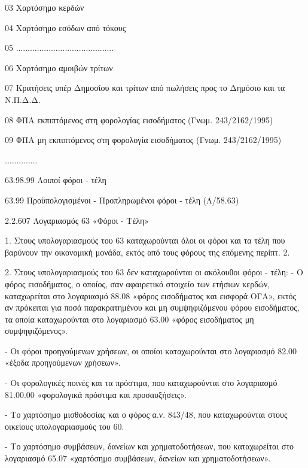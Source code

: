 \documentclass[A4,10pt,greek]{book}
\begin{document}
                              03   Χαρτόσημο κερδών

                              04   Χαρτόσημο εσόδων από τόκους

                              05   ..........................................

                              06   Χαρτόσημο αμοιβών τρίτων

                              07   Κρατήσεις υπέρ Δημοσίου και τρίτων από πωλήσεις προς το
                                      Δημόσιο και τα Ν.Π.Δ.Δ.

                              08   ΦΠΑ εκπιπτόμενος στη φορολογίας εισοδήματος
                                      (Γνωμ. 243/2162/1995)

                              09   ΦΠΑ μη εκπιπτόμενος στη φορολογία εισοδήματος
                                      (Γνωμ. 243/2162/1995)

                    ..............

                    63.98.99       Λοιποί φόροι - τέλη

        63.99   Προϋπολογισμένοι - Προπληρωμένοι φόροι - τέλη (Λ/58.63)  

 

2.2.607 Λογαριασμός 63 «Φόροι - Τέλη»

1. Στους υπολογαριασμούς του 63 καταχωρούνται όλοι οι φόροι και τα τέλη που βαρύνουν την οικονομική μονάδα, εκτός από τους φόρους της επόμενης περίπτ. 2.

2. Στους υπολογαριασμούς του 63 δεν καταχωρούνται οι ακόλουθοι φόροι - τέλη:  - Ο φόρος εισοδήματος, ο οποίος, σαν αφαιρετικό στοιχείο των ετήσιων κερδών, καταχωρείται στο λογαριασμό 88.08 «φόρος εισοδήματος και εισφορά ΟΓΑ», εκτός αν πρόκειται για ποσά παρακρατημένου και μη συμψηφιζόμενου φόρου εισοδήματος, τα οποία καταχωρούνται στο λογαριασμό 63.00 «φόρος εισοδήματος μη συμψηφιζόμενος».

- Οι φόροι προηγούμενων χρήσεων, οι οποίοι καταχωρούνται στο λογαριασμό 82.00 «έξοδα προηγούμενων χρήσεων».

- Οι φορολογικές ποινές και τα πρόστιμα, που καταχωρούνται στο λογαριασμό 81.00.00 «φορολογικά πρόστιμα και προσαυξήσεις».

- Το χαρτόσημο μισθοδοσίας και ο φόρος α.ν. 843/48, που καταχωρούνται στους οικείους υπολογαριασμούς του 60.

- Το χαρτόσημο συμβάσεων, δανείων και χρηματοδοτήσεων, που καταχωρείται στο λογαριασμό 65.07 «χαρτόσημο συμβάσεων, δανείων και χρηματοδοτήσεων».
\end{document}
